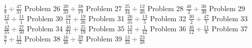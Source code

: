 \documentclass{article}
\begin{document}
$\displaystyle \frac{1}{8} \div \frac{47}{31}$
\newline
\hfill \break
Problem 26
\newline
\hfill \break
$\displaystyle \frac{20}{33} \div \frac{38}{19}$
\newline
\hfill \break
Problem 27
\newline
\hfill \break
$\displaystyle \frac{25}{34} \div \frac{12}{46}$
\newline
\hfill \break
Problem 28
\newline
\hfill \break
$\displaystyle \frac{48}{2} \div \frac{30}{30}$
\newline
\hfill \break
Problem 29
\newline
\hfill \break
$\displaystyle \frac{12}{5} \div \frac{11}{1}$
\newline
\hfill \break
Problem 30
\newline
\hfill \break
$\displaystyle \frac{18}{11} \div \frac{19}{26}$
\newline
\hfill \break
Problem 31
\newline
\hfill \break
$\displaystyle \frac{26}{35} \div \frac{13}{5}$
\newline
\hfill \break
Problem 32
\newline
\hfill \break
$\displaystyle \frac{30}{2} \div \frac{47}{7}$
\newline
\hfill \break
Problem 33
\newline
\hfill \break
$\displaystyle \frac{42}{35} \div \frac{27}{50}$
\newline
\hfill \break
Problem 34
\newline
\hfill \break
$\displaystyle \frac{46}{21} \div \frac{25}{19}$
\newline
\hfill \break
Problem 35
\newline
\hfill \break
$\displaystyle \frac{12}{11} \div \frac{1}{42}$
\newline
\hfill \break
Problem 36
\newline
\hfill \break
$\displaystyle \frac{46}{12} \div \frac{11}{8}$
\newline
\hfill \break
Problem 37
\newline
\hfill \break
$\displaystyle \frac{9}{7} \div \frac{11}{32}$
\newline
\hfill \break
Problem 38
\newline
\hfill \break
$\displaystyle \frac{16}{46} \div \frac{39}{6}$
\newline
\hfill \break
Problem 39
\newline
\hfill \break
$\displaystyle \frac{13}{33} \div \frac{23}{48}$
\end{document}
